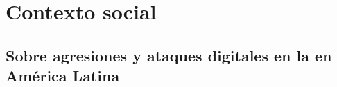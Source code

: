 \documentclass[12pt]{caltech_thesis}
\begin{document}








\chapter{Contexto social}

\section{Sobre agresiones y ataques digitales en la en América Latina}
\end{document}
